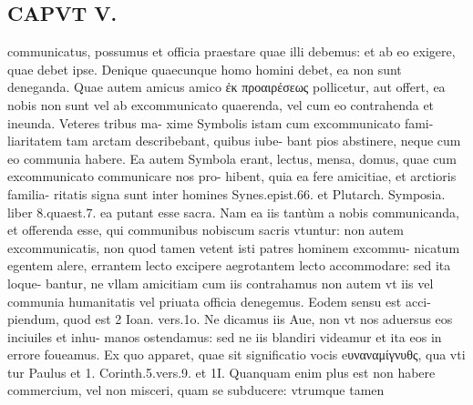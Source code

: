 \documentclass{article}
\begin{document}
\begin{pages}
\section*{CAPVT  V. }
\marginpar{[ p.405 ]}\pstart communicatus, possumus et officia praestare quae illi debemus: et ab eo exigere, quae debet ipse. Denique quaecunque homo homini debet, ea non sunt deneganda. Quae autem amicus amico ἐκ προαιρέσεως pollicetur, aut offert, ea nobis non sunt vel ab excommunicato quaerenda, vel cum eo contrahenda et ineunda. Veteres tribus ma- xime Symbolis istam cum excommunicato fami- liaritatem tam arctam describebant, quibus iube- bant pios abstinere, neque  cum eo communia habere. Ea autem Symbola erant, lectus, mensa, domus, quae cum excommunicato communicare nos pro- hibent, quia ea fere amicitiae, et arctioris familia- ritatis signa sunt inter homines Synes.epist.66. et Plutarch. Symposia. liber  8.quaest.7. ea putant esse sacra. Nam ea iis tantùm a nobis communicanda, et offerenda esse, qui communibus nobiscum sacris vtuntur: non autem excommunicatis, non quod tamen vetent isti patres hominem excommu- nicatum egentem alere, errantem lecto excipere aegrotantem lecto accommodare: sed ita loque- bantur, ne vllam amicitiam cum iis contrahamus non autem vt iis vel communia humanitatis vel priuata officia denegemus. Eodem sensu est acci- piendum, quod est 2 Ioan. vers.1o. Ne dicamus iis Aue, non vt nos aduersus eos inciuiles et inhu- manos ostendamus: sed ne iis blandiri videamur et ita eos in errore foueamus. Ex quo apparet, quae sit significatio vocis eυναναμίγνυθς, qua vti tur Paulus et 1. Corinth.5.vers.9. et 1I. Quanquam enim plus est non habere commercium, vel non misceri, quam se subducere: vtrumque tamen  \pend

\end{pages}
\end{document}
